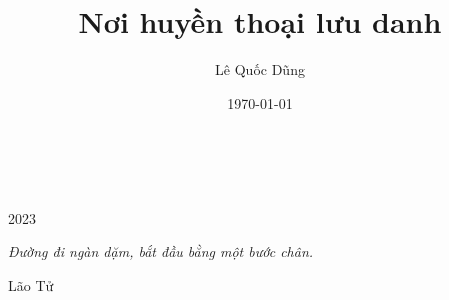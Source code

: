 \documentclass{article}
\title{Nơi huyền thoại lưu danh}
\author{Lê Quốc Dũng}
\date{\today}
\theoremstyle{definition}
\begin{document}
\newenvironment{myexampleblock}[1]{%
    \tcolorbox[colback=LightGreen,colframe=DarkGreen,title=#1]}
    {\endtcolorbox}

\newenvironment{defblock}[2]{%
    \tcolorbox[colback=white,colframe=blue,title=#1
    ]}
    {\endtcolorbox}

\newenvironment{theoremblock}[2]{%
    \tcolorbox[colback=white,colframe=magenta,title=#1
    ]}
    {\endtcolorbox}

\begin{titlepage}
		\\
			
		\vspace{10mm}
		\\
		\vspace{\fill}
		\centering \large{2023}
\end{titlepage}

\newpage

\vspace*{2cm}

\begin{center}
	\Large{\parbox{10cm}{
		\begin{raggedright}
		{\Large 
			\textit{Đường đi ngàn dặm, bắt đầu bằng một bước chân.}
		}
	
		\vspace{.5cm}\hfill{Lão Tử}
		\end{raggedright}
	}
}
\end{center}

\newpage

\tableofcontents

\newpage










\end{document}
